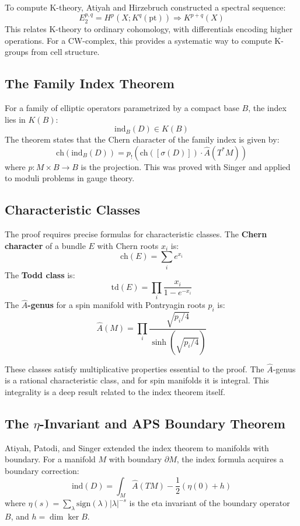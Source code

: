 To compute K-theory, Atiyah and Hirzebruch constructed a spectral sequence:
\[E_2^{p,q} = H^p(X; K^q(\text{pt})) \Rightarrow K^{p+q}(X)\]
This relates K-theory to ordinary cohomology, with differentials encoding
higher operations. For a CW-complex, this provides a systematic way to
compute K-groups from cell structure.

\subsection*{The Family Index Theorem}

For a family of elliptic operators parametrized by a compact base $B$, the
index lies in $K(B)$:
\[\text{ind}_B(D) \in K(B)\]
The theorem states that the Chern character of the family index is given by:
\[\text{ch}(\text{ind}_B(D)) = p_!(\text{ch}([\sigma(D)]) \cdot \widehat{A}(T^*M))\]
where $p: M \times B \to B$ is the projection. This was proved with Singer and
applied to moduli problems in gauge theory.

\subsection*{Characteristic Classes}

The proof requires precise formulas for characteristic classes. The
\textbf{Chern character} of a bundle $E$ with Chern roots $x_i$ is:
\[\text{ch}(E) = \sum_i e^{x_i}\]
The \textbf{Todd class} is:
\[\text{td}(E) = \prod_i \frac{x_i}{1 - e^{-x_i}}\]
The \textbf{$\widehat{A}$-genus} for a spin manifold with Pontryagin roots $p_i$ is:
\[\widehat{A}(M) = \prod_i \frac{\sqrt{p_i/4}}{\sinh(\sqrt{p_i/4})}\]

These classes satisfy multiplicative properties essential to the proof.
The $\widehat{A}$-genus is a rational characteristic class, and for spin
manifolds it is integral. This integrality is a deep result related to
the index theorem itself.

\subsection*{The $\eta$-Invariant and APS Boundary Theorem}

Atiyah, Patodi, and Singer extended the index theorem to manifolds with
boundary. For a manifold $M$ with boundary $\partial M$, the index formula
acquires a boundary correction:
\[\text{ind}(D) = \int_M \widehat{A}(TM) - \frac{1}{2}(\eta(0) + h)\]
where $\eta(s) = \sum_\lambda \text{sign}(\lambda)|\lambda|^{-s}$ is the eta
invariant of the boundary operator $B$, and $h = \dim \ker B$.

